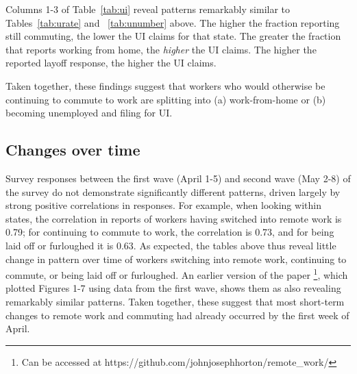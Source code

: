 \documentclass[12pt]{article}
\begin{document}
Columns 1-3 of Table~\ref{tab:ui} reveal patterns remarkably similar to Tables~\ref{tab:urate} and ~\ref{tab:unumber} above. The higher the fraction reporting still commuting, the lower the UI claims for that state. The greater the fraction that reports working from home, the \emph{higher} the UI claims. The higher the reported layoff response, the higher the UI claims.



Taken together, these findings suggest that workers who would otherwise be continuing to commute to work are splitting into (a) work-from-home or (b) becoming unemployed and filing for UI.




\subsection{Changes over time} \label{sec:timechanges}

Survey responses between the first wave (April 1-5) and second wave (May 2-8) of the survey do not demonstrate significantly different patterns, driven largely by strong positive correlations in responses. For example, when looking within states, the correlation in reports of workers having switched into remote work is 0.79; for continuing to commute to work, the correlation is 0.73, and for being laid off or furloughed it is 0.63. As expected, the tables above thus reveal little change in pattern over time of workers switching into remote work, continuing to commute, or being laid off or furloughed. An earlier version of the paper \footnote{Can be accessed at https://github.com/johnjosephhorton/remote_work/}, which plotted Figures 1-7 using data from the first wave, shows them as also revealing remarkably similar patterns. Taken together, these suggest that most short-term changes to remote work and commuting had already occurred by the first week of April. 
\end{document}
